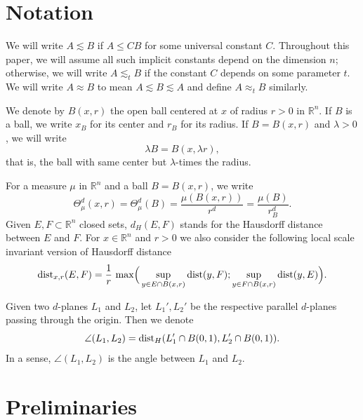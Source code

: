 \documentclass[11pt]{amsart}
\newcommand{\R}{{\mathbb R}}       %
\newcommand{\dist}{{\rm dist}}
\newcommand{\vv}{{\vspace{2mm}}}
\theoremstyle{definition}
\theoremstyle{remark}
\numberwithin{equation}{section}
\newcommand{\hdis}[1]{{\mbox{\dist}}_{#1}}
\begin{document}
\vv


\section{Notation}\label{sec:notation}
 We will write $A\lesssim B$ if $A\leq CB$ for some universal constant $C$. Throughout this paper, we will assume all such implicit constants depend on the dimension $n$; otherwise, we will write $A\lesssim_{t}B$ if the constant $C$ depends on some parameter $t$. We will write $A\approx B$ to mean $A\lesssim B\lesssim A$ and define $A\approx_{t}B$ similarly.
 
We denote by $B(x,r)$  the open ball centered at $x$ of radius $r>0$ in $\R^n$. If $B$ is a ball, we write $x_{B}$ for its center and $r_{B}$ for its radius. If $B=B(x,r)$ and $\lambda>0$, we will write
\[
\lambda B= B(x,\lambda r),
\]
that is, the ball with same center but $\lambda$-times the radius. 

For a measure $\mu$ in $\R^n$ and a ball $B=B(x,r)$, we write
\[
\Theta_{\mu}^{d}(x,r) = \Theta_{\mu}^{d}(B) = \frac{\mu(B(x,r))}{r^{d}}=\frac{\mu(B)}{r_{B}^{d}} . \]
Given $E,F\subset \R^n$ closed sets, $d_H(E,F)$ stands for the Hausdorff distance between $E$ and $F$. For $x\in
\R^n$ and $r>0$ we also consider the following local scale invariant version of Hausdorff distance
$$\hdis{x,r}(E,F) = \frac1r\,\max\Bigl(\,\sup_{y\in E\cap B(x,r)}\dist(y,F); \sup_{y\in F\cap B(x,r)}\dist(y,E)\Bigr).$$




Given two $d$-planes $L_{1}$ and $L_{2}$,  let $L_{1}', L_2'$ be the respective parallel $d$-planes passing through the origin.
Then we denote
\[
\angle(L_{1},L_{2})=\dist_{H}(L_{1}'\cap B(0,1),L_{2}'\cap B(0,1)).
\]
In a sense, $\angle(L_{1},L_{2})$ is the angle between $L_1$ and $L_2$.

\vv 


\section{Preliminaries}

\end{document}
